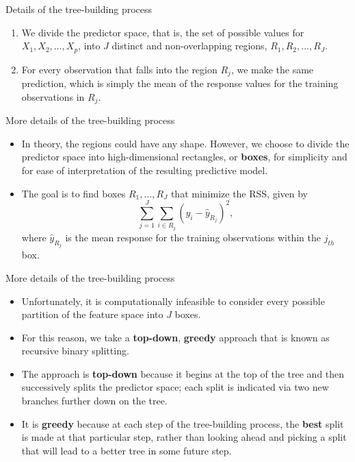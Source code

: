 \documentclass[aspectratio=169, 11pt]{beamer}
\begin{document}
\begin{frame}{Details of the tree-building process}
    \begin{enumerate}
        \item We divide the predictor space, that is, the set of possible values for $X_1, X_2, \dots, X_p$, into $J$ distinct and non-overlapping regions, $R_{1},R_{2},...,R_{J}$.
        \item For every observation that falls into the region $R_{j}$, we make the same prediction, which is simply the mean of the response values for the training observations in $R_{j}$.
    \end{enumerate}
\end{frame}

\begin{frame}{More details of the tree-building process}
    \begin{itemize}
        \item In theory, the regions could have any shape. However, we choose to divide the predictor space into high-dimensional rectangles, or \textbf{boxes}, for simplicity and for ease of interpretation of the resulting predictive model.
        \item The goal is to find boxes $R_{1},...,R_{J}$ that minimize the RSS, given by
        \begin{equation*}
        \sum_{j=1}^{J}\sum_{i\in R_{j}}(y_{i}-\hat{y}_{R_{j}})^{2},
        \end{equation*}
        where $\hat{y}_{R_{j}}$ is the mean response for the training observations within the $j_{th}$ box.
    \end{itemize}
\end{frame}

\begin{frame}{More details of the tree-building process}
    \begin{itemize}
        \item Unfortunately, it is computationally infeasible to consider every possible partition of the feature space into $J$ boxes.
        \item For this reason, we take a \textbf{top-down}, \textbf{greedy} approach that is known as recursive binary splitting.
        \item The approach is \textbf{top-down} because it begins at the top of the tree and then successively splits the predictor space; each split is indicated via two new branches further down on the tree.
        \item It is \textbf{greedy} because at each step of the tree-building process, the \textbf{best} split is made at that particular step, rather than looking ahead and picking a split that will lead to a better tree in some future step.
    \end{itemize}
\end{frame}
\end{document}
